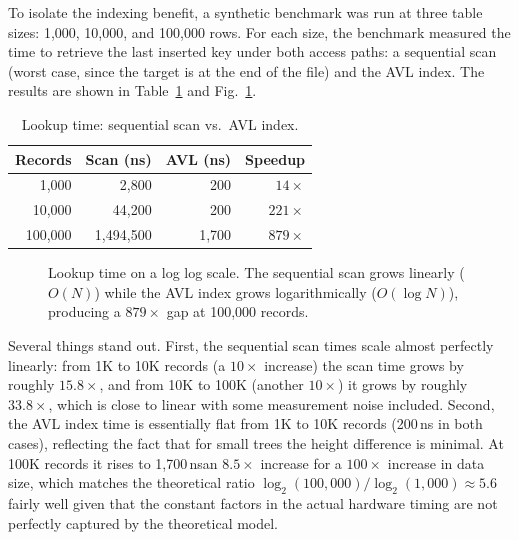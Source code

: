 \documentclass[conference]{IEEEtran}
\begin{document}
To isolate the indexing benefit, a synthetic benchmark was run at three table
sizes: 1,000, 10,000, and 100,000 rows. For each size, the benchmark measured
the time to retrieve the last inserted key under both access paths: a sequential
scan (worst case, since the target is at the end of the file) and the AVL index.
The results are shown in Table~\ref{tab:index} and Fig.~\ref{fig:lookup}.

\begin{table}[h]
\centering
\caption{Lookup time: sequential scan vs.\ AVL index.}
\label{tab:index}
\begin{tabular}{rrrr}
\toprule
\textbf{Records} & \textbf{Scan (ns)} & \textbf{AVL (ns)} & \textbf{Speedup} \\
\midrule
1{,}000    &     2{,}800 &     200 & $14\times$  \\
10{,}000   &    44{,}200 &     200 & $221\times$ \\
100{,}000  & 1{,}494{,}500 & 1{,}700 & $879\times$ \\
\bottomrule
\end{tabular}
\end{table}

\begin{figure}[h]
\centering
{}
\caption{Lookup time on a log log scale. The sequential scan grows
linearly ($O(N)$) while the AVL index grows logarithmically ($O(\log N)$),
producing a $879\times$ gap at 100,000 records.}
\label{fig:lookup}
\end{figure}

Several things stand out. First, the sequential scan times scale almost perfectly
linearly: from 1K to 10K records (a $10\times$ increase) the scan time grows by
roughly $15.8\times$, and from 10K to 100K (another $10\times$) it grows by
roughly $33.8\times$, which is close to linear with some measurement noise
included. Second, the AVL index time is essentially flat from 1K to 10K records
(200\,ns in both cases), reflecting the fact that for small trees the height
difference is minimal. At 100K records it rises to 1,700\,nsan $8.5\times$
increase for a $100\times$ increase in data size, which matches the theoretical
ratio $\log_2(100{,}000) / \log_2(1{,}000) \approx 5.6$ fairly well given that
the constant factors in the actual hardware timing are not perfectly captured by
the theoretical model.
\end{document}
